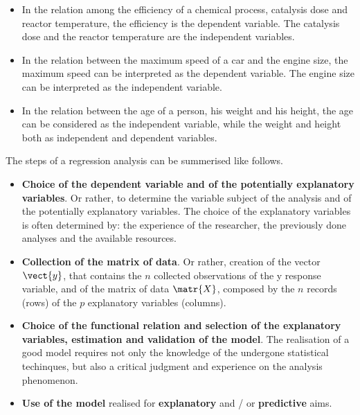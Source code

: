 \begin{frame}
  \begin{itemize}
    \item In the relation among the efficiency of a chemical process, catalysis dose and reactor temperature, the efficiency is the dependent variable. The catalysis dose and the reactor temperature are the independent variables.
    \vspace*{.15cm}
    \item In the relation between the maximum speed of a car and the engine size, the maximum speed can be interpreted as the dependent variable. The engine size can be interpreted as the independent variable.
    \vspace*{.15cm}
    \item In the relation between the age of a person, his weight and his height, the age can be considered as  the independent variable, while the weight and height both as independent and dependent variables.
  \end{itemize}
\end{frame}


\begin{frame}
  \begin{small}
  The steps of a regression analysis can be summerised like follows.
  \begin{itemize}
    \vspace{-0.05cm}
    \item \textbf{Choice of the dependent variable and of the potentially explanatory variables}. Or rather, to determine the variable subject of the analysis and of the potentially explanatory variables. The choice of the explanatory variables is often determined by: the experience of the researcher, the previously done analyses and the available resources. 
    \vspace{-0.05cm}
    \item \textbf{Collection of the matrix of data}. Or rather, creation of the vector $ \vect{y} $, that contains the $ n $ collected observations of the y response variable, and of the matrix of data $ \matr{X} $, composed by the $ n $ records (rows) of the $ p $ explanatory variables (columns).
    \vspace{-0.05cm}
    \item \textbf{Choice of the functional relation and selection of the explanatory variables, estimation and validation of the model}. The realisation of a good model requires not only the knowledge of the undergone statistical techinques, but also a critical judgment and experience on the analysis phenomenon.
    \vspace{-0.05cm}
    \item \textbf{Use of the model} realised for \textbf{explanatory} and / or \textbf{predictive} aims.
  \end{itemize}
  \end{small}
\end{frame}

